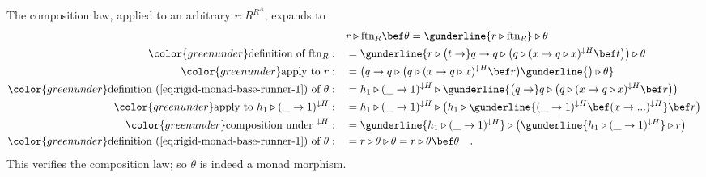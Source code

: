 The composition law, applied to an arbitrary $r:R^{R^{A}}$, expands
to
\begin{align*}
 & r\triangleright\text{ftn}_{R}\bef\theta=\gunderline{r\triangleright\text{ftn}_{R}}\triangleright\theta\\
{\color{greenunder}\text{definition of }\text{ftn}_{R}:}\quad & =\gunderline{r\triangleright\big(t\rightarrow}q\rightarrow q\triangleright\big(q\triangleright(x\rightarrow q\triangleright x)^{\downarrow H}\bef t\big)\big)\triangleright\theta\\
{\color{greenunder}\text{apply to }r:}\quad & =\big(q\rightarrow q\triangleright\big(q\triangleright(x\rightarrow q\triangleright x)^{\downarrow H}\bef r\big)\gunderline{\big)\triangleright\theta}\\
{\color{greenunder}\text{definition~(\ref{eq:rigid-monad-base-runner-1}) of }\theta:}\quad & =h_{1}\triangleright(\_\rightarrow1)^{\downarrow H}\triangleright\gunderline{\big(q\rightarrow}q\triangleright\big(q\triangleright(x\rightarrow q\triangleright x)^{\downarrow H}\bef r\big)\big)\\
{\color{greenunder}\text{apply to }h_{1}\triangleright(\_\rightarrow1)^{\downarrow H}:}\quad & =h_{1}\triangleright(\_\rightarrow1)^{\downarrow H}\triangleright\big(h_{1}\triangleright\gunderline{(\_\rightarrow1)^{\downarrow H}\bef(x\rightarrow...)^{\downarrow H}}\bef r\big)\\
{\color{greenunder}\text{composition under }^{\downarrow H}:}\quad & =\gunderline{h_{1}\triangleright(\_\rightarrow1)^{\downarrow H}}\triangleright\big(\gunderline{h_{1}\triangleright(\_\rightarrow1)^{\downarrow H}}\triangleright r\big)\\
{\color{greenunder}\text{definition~(\ref{eq:rigid-monad-base-runner-1}) of }\theta:}\quad & =r\triangleright\theta\triangleright\theta=r\triangleright\theta\bef\theta\quad.
\end{align*}
This verifies the composition law; so $\theta$ is indeed a monad
morphism.

